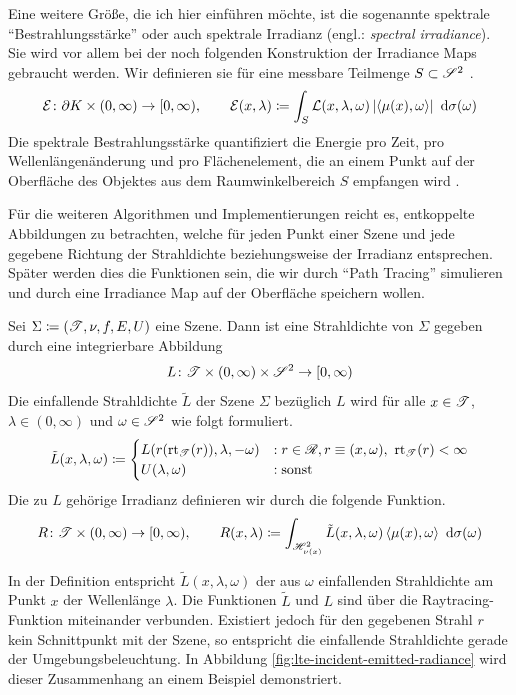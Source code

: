 		Eine weitere Größe, die ich hier einführen möchte, ist die sogenannte spektrale \enquote{Bestrahlungsstärke} oder auch spektrale Irradianz (engl.: \textit{spectral irradiance}).
		Sie wird vor allem bei der noch folgenden Konstruktion der Irradiance Maps gebraucht werden.
		Wir definieren sie für eine messbare Teilmenge $S\subset\mathscr{S}^{2}$ \cite[S.~9~f]{guide-radiometry}.
		\[
			\mathcal{E}\colon\partial K\times (0,\infty)\to[0,\infty),\qquad \mathcal{E}(x,\lambda) \coloneqq \int_{S}^{}  \mathcal{L}(x,\lambda,\omega)\left\vert \left\langle \mu(x),\omega \right\rangle \right\vert \ \mathrm{d} \sigma(\omega)
		\]
		Die spektrale Bestrahlungsstärke quantifiziert die Energie pro Zeit, pro Wellenlängenänderung und pro Flächenelement, die an einem Punkt auf der Oberfläche des Objektes aus dem Raumwinkelbereich $S$ empfangen wird \cite{intro-radiometry,guide-radiometry}.

		Für die weiteren Algorithmen und Implementierungen reicht es, entkoppelte Abbildungen zu betrachten, welche für jeden Punkt einer Szene und jede gegebene Richtung der Strahldichte beziehungsweise der Irradianz entsprechen.
		Später werden dies die Funktionen sein, die wir durch \enquote{Path Tracing} simulieren und durch eine Irradiance Map auf der Oberfläche speichern wollen.
		\begin{definition}
			Sei $\Sigma\coloneqq (\mathscr{T},\nu,f,E,U)$ eine Szene.
			Dann ist eine Strahldichte von $\Sigma$ gegeben durch eine integrierbare Abbildung
			\[
				L\colon\mathscr{T}\times(0,\infty)\times\mathscr{S}^{2}\to[0,\infty)
			\]
			Die einfallende Strahldichte $\tilde{L}$ der Szene $\Sigma$ bezüglich $L$ wird für alle $x\in\mathscr{T}$, $\lambda\in(0,\infty)$ und $\omega\in\mathscr{S}^{2}$ wie folgt formuliert.
			\[
				\tilde{L}(x,\lambda,\omega)\coloneqq
				\begin{cases}
					L(r(\mathrm{rt}_{\mathscr{T}}(r)),\lambda,-\omega) &: r\in\mathscr{R}, r\equiv(x,\omega),\ \mathrm{rt}_{\mathscr{T}}(r) < \infty \\
					U(\lambda,\omega) &: \mathrm{sonst}
				\end{cases}
			\]
			Die zu $L$ gehörige Irradianz definieren wir durch die folgende Funktion.
			\[
				R\colon\mathscr{T}\times(0,\infty)\to[0,\infty),\qquad R(x,\lambda)\coloneqq \int_{\mathscr{H}^{2}_{\nu(x)}}^{} \tilde{L}(x,\lambda,\omega)\left\langle \mu(x),\omega \right\rangle\ \mathrm{d} \sigma(\omega)
			\]
		\end{definition}

		In der Definition entspricht $\tilde{L}(x,\lambda,\omega)$ der aus $\omega$ einfallenden Strahldichte am Punkt $x$ der Wellenlänge $\lambda$.
		Die Funktionen $\tilde{L}$ und $L$ sind über die Raytracing-Funktion miteinander verbunden.
		Existiert jedoch für den gegebenen Strahl $r$ kein Schnittpunkt mit der Szene, so entspricht die einfallende Strahldichte gerade der Umgebungsbeleuchtung.
		In Abbildung \ref{fig:lte-incident-emitted-radiance} wird dieser Zusammenhang an einem Beispiel demonstriert.

